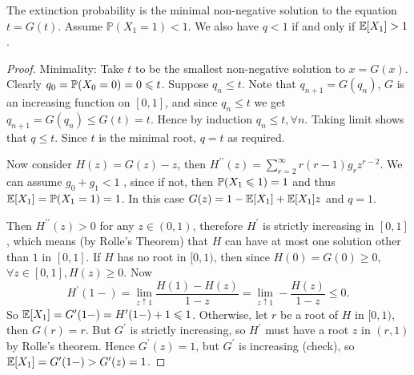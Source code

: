 \begin{theorem}
    The extinction probability is the minimal non-negative solution to the equation $t=G(t)$. Assume $ \mathbb{P}(X_1=1)<1 $. We also have $ q<1 $ if and only if $ {\mathbb{E}}[X_1]>1 $.
\end{theorem}
\begin{proof}
    Minimality: Take $t$ to be the smallest non-negative solution to $x=G(x)$. Clearly $ q_0={\mathbb{P}}(X_0=0)=0\leqslant t $. Suppose $ q_n\le t $. Note that $q_{n+1}=G(q_n)$, $G$ is an increasing function on $[0,1]$, and since $ q_n\le t $ we get $ q_{n+1}=G(q_n)\le G(t)=t $. Hence by induction $ q_n\le t,\forall n $. Taking limit shows that $ q\le t $. Since $t$ is the minimal root, $ q=t $ as required.

    Now consider $H(z)=G(z)-z$, then $H^{\prime\prime}(z)=\sum_{r=2}^\infty r(r-1)g_rz^{r-2}$.
    We can assume $g_0+g_1<1$ , since if not, then $ {\mathbb{P}}(X_1\leqslant 1)=1 $ and thus $ {\mathbb{E}}[X_1]={\mathbb{P}}(X_1=1)=1 $. In this case $ G(z)=1-{\mathbb{E}}[X_1]+{\mathbb{E}}[X_1]z $ and $ q=1 $.

    Then $H^{\prime\prime}(z)>0$ for any $z\in (0,1)$, therefore $H^\prime$ is strictly increasing in $[0,1]$, which means (by Rolle's Theorem) that $H$ can have at most one solution other than $1$ in $[0,1]$.
    If $H$ has no root in $[0,1)$, then since $H(0)=G(0)\ge 0$, $\forall z\in [0,1],H(z)\ge 0$.
    Now
    $$H^\prime(1-)=\lim_{z \uparrow 1}\frac{H(1)-H(z)}{1-z}=\lim_{z \uparrow 1}-\frac{H(z)}{1-z}\le 0.$$
    So ${\mathbb{E}}[X_1]=G^\prime(1-)=H^\prime(1-)+1\leqslant1$.
    Otherwise, let $r$ be a root of $H$ in $[0,1)$, then $G(r)=r$.
    But $G^\prime$ is strictly increasing, so $H^\prime$ must have a root $z$ in $(r,1)$ by Rolle's theorem.
    Hence $G^\prime(z)=1$, but $G^\prime$ is increasing (check), so ${\mathbb{E}}[X_1]=G^\prime(1-)>G^\prime(z)=1$.
\end{proof}